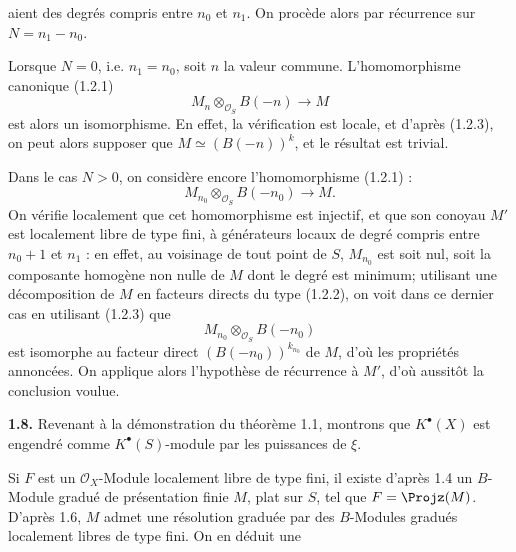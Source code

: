 aient des degrés compris entre \(n_0\) et \(n_1\). On procède alors par récurrence sur \(N=n_1-n_0\).

Lorsque \(N=0\), i.e. \(n_1=n_0\), soit \(n\) la valeur commune. L'homomorphisme canonique (1.2.1)
\[
  M_n\otimes_{\mathcal O_S}B(-n)\longrightarrow M
\]
est alors un isomorphisme. En effet, la vérification est locale, et d'après (1.2.3), on peut alors supposer que \(M\simeq(B(-n))^k\), et le résultat est trivial.

Dans le cas \(N>0\), on considère encore l'homomorphisme (1.2.1) :
\[
  M_{n_0}\otimes_{\mathcal O_S}B(-n_0)\longrightarrow M.
\]
On vérifie localement que cet homomorphisme est injectif, et que son conoyau \(M'\) est localement libre de type fini, à générateurs locaux de degré compris entre \(n_0+1\) et \(n_1\) : en effet, au voisinage de tout point de \(S\), \(M_{n_0}\) est soit nul, soit la composante homogène non nulle de \(M\) dont le degré est minimum; utilisant une décomposition de \(M\) en facteurs directs du type (1.2.2), on voit dans ce dernier cas en utilisant (1.2.3) que
\[
  M_{n_0}\otimes_{\mathcal O_S}B(-n_0)
\]
est isomorphe au facteur direct \((B(-n_0))^{k_{n_0}}\) de \(M\), d'où les propriétés annoncées. On applique alors l'hypothèse de récurrence à \(M'\), d'où aussitôt la conclusion voulue.

\textbf{1.8.} Revenant à la démonstration du théorème 1.1, montrons que \(K^{\bullet}(X)\) est engendré comme \(K^{\bullet}(S)\)-module par les puissances de \(\xi\).

Si \(F\) est un \(\mathcal O_X\)-Module localement libre de type fini, il existe d'après 1.4 un \(B\)-Module gradué de présentation finie \(M\), plat sur \(S\), tel que \(F=\Projz(M)\). D'après 1.6, \(M\) admet une résolution graduée par des \(B\)-Modules gradués localement libres de type fini. On en déduit une
